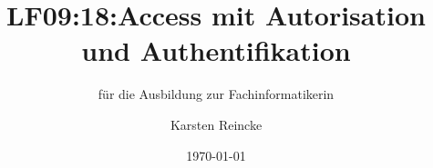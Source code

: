 \documentclass[]{beamer}
\title{LF09:18:Access mit Autorisation und Authentifikation}
\subtitle{für die Ausbildung zur Fachinformatikerin}
\institute[GS-LDK]{Gewerbliche Schulen Dillenburg}
\author{Karsten Reincke}
\date{\today}
\def\cfgGl{../../../cfg.gl/}
\begin{document}

\begin{frame}
  \titlepage

  
\end{frame}






\logo{}
\newpage



%
\end{document}
